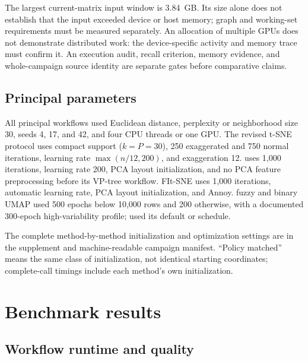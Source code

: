 \documentclass[article]{jss}
\newcommand{\fastEmbedR}{\pkg{fastEmbedR}\xspace}
\begin{document}
The largest current-matrix input window is 3.84~GB. Its size alone does not
establish that the input exceeded device or host memory; graph and
working-set requirements must be measured separately. An allocation
of multiple GPUs does not demonstrate distributed work:
the device-specific activity and memory trace must confirm it. An
execution audit, recall criterion, memory evidence, and whole-campaign
source identity are separate gates before comparative claims.

\subsection{Principal parameters}

All principal workflows used Euclidean distance, perplexity or neighborhood
size 30, seeds 4, 17, and 42, and four CPU threads or one GPU. The revised
\fastEmbedR t-SNE protocol uses compact support ($k=P=30$), 250 exaggerated
and 750 normal iterations, learning rate $\max(n/12,200)$, and
exaggeration 12.
 uses 1,000 iterations, learning rate 200, PCA layout
initialization, and no PCA feature preprocessing before its VP-tree
workflow. FIt-SNE uses 1,000 iterations, automatic learning rate, PCA layout
initialization, and Annoy. \fastEmbedR fuzzy and binary UMAP used 500 epochs
below 10,000 rows and 200 otherwise, with a documented 300-epoch
high-variability profile;  used its default or
 schedule.

The complete method-by-method initialization and optimization settings are
in the supplement and machine-readable campaign manifest. ``Policy matched''
means the same class of initialization, not identical starting coordinates;
complete-call timings include each method's own initialization.

\section{Benchmark results}

\subsection{Workflow runtime and quality}
\end{document}
